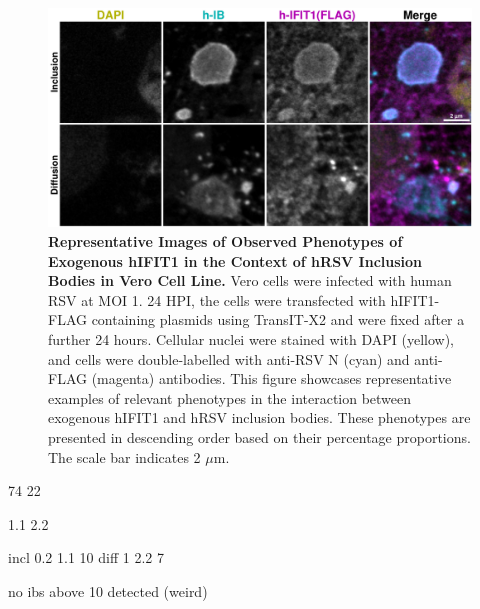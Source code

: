\begin{figure}
    \centering
    \includegraphics[width=1\linewidth]{09. Chapter 4/Figs/02. Overexpression/01. IFIT1/03. i1-hrsv.pdf}
    \caption[Representative Images of Observed Phenotypes of Exogenous hIFIT1 in the Context of hRSV Inclusion Bodies in Vero Cell Line.]{\textbf{Representative Images of Observed Phenotypes of Exogenous hIFIT1 in the Context of hRSV Inclusion Bodies in Vero Cell Line.} Vero cells were infected with human RSV at MOI 1. 24 HPI, the cells were transfected with hIFIT1-FLAG containing plasmids using TransIT-X2 and were fixed after a further 24 hours. Cellular nuclei were stained with DAPI (yellow), and cells were double-labelled with anti-RSV N (cyan) and anti-FLAG (magenta) antibodies. This figure showcases representative examples of relevant phenotypes in the interaction between exogenous hIFIT1 and hRSV inclusion bodies. These phenotypes are presented in descending order based on their percentage proportions. The scale bar indicates 2 \(\mu \mbox{m}\).}
    \label{fig:Representative Images of Observed Phenotypes of Exogenous hIFIT1 in the Context of hRSV Inclusion Bodies in VERO Cell Line}
\end{figure}



74 22

1.1 2.2

incl 0.2 1.1 10
diff 1 2.2 7

no ibs above 10 detected (weird)

